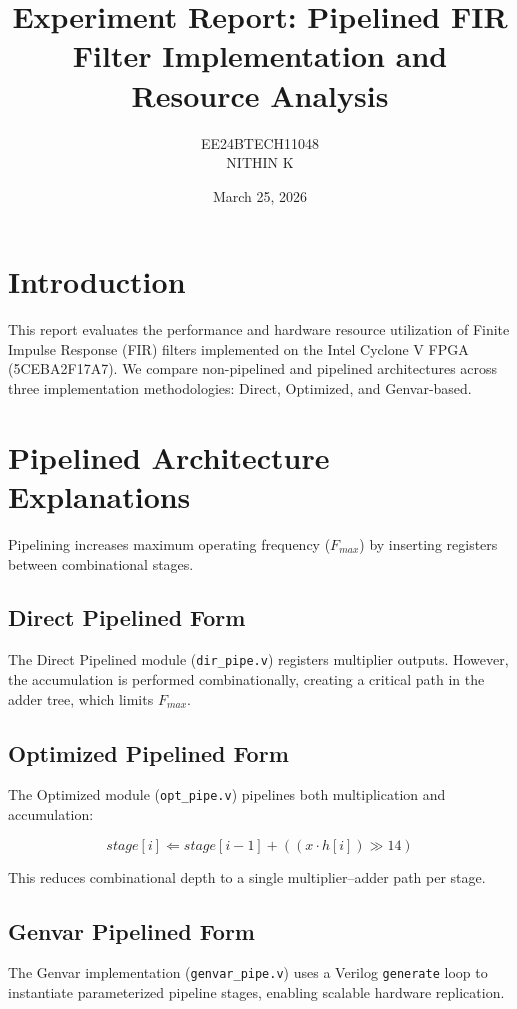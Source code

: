 \documentclass[11pt,a4paper]{article}
\title{Experiment Report: Pipelined FIR Filter Implementation and Resource Analysis}
\author{EE24BTECH11048\\NITHIN K}
\date{March 25, 2026}
\begin{document}
\maketitle

\section{Introduction}
This report evaluates the performance and hardware resource utilization of Finite Impulse Response (FIR) filters implemented on the Intel Cyclone V FPGA (5CEBA2F17A7). We compare non-pipelined and pipelined architectures across three implementation methodologies: Direct, Optimized, and Genvar-based.

\section{Pipelined Architecture Explanations}

Pipelining increases maximum operating frequency ($F_{max}$) by inserting registers between combinational stages.

\subsection{Direct Pipelined Form}
The Direct Pipelined module (\texttt{dir\_pipe.v}) registers multiplier outputs. However, the accumulation is performed combinationally, creating a critical path in the adder tree, which limits $F_{max}$.

\subsection{Optimized Pipelined Form}
The Optimized module (\texttt{opt\_pipe.v}) pipelines both multiplication and accumulation:

\begin{equation}
stage[i] \Leftarrow stage[i-1] + ((x \cdot h[i]) \gg 14)
\end{equation}

This reduces combinational depth to a single multiplier–adder path per stage.

\subsection{Genvar Pipelined Form}
The Genvar implementation (\texttt{genvar\_pipe.v}) uses a Verilog \texttt{generate} loop to instantiate parameterized pipeline stages, enabling scalable hardware replication.
\end{document}
